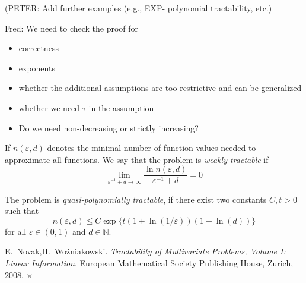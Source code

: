 \documentclass[11pt,a4paper]{article}
\newcommand{\fred}[1]{\begingroup\color{blue}Fred: #1\endgroup}
\newcommand{\peter}[1]{\begingroup\color{purple}#1\endgroup}
\begin{document}
\peter{(PETER: Add further examples (e.g., EXP- polynomial tractability, etc.)}

\bigskip

\fred{We need to check the proof for
\begin{itemize}
\item correctness
\item exponents
\item whether the additional assumptions are too restrictive and can be generalized
\item whether we need $\tau$ in the assumption
\item Do we need non-decreasing or strictly increasing?
\end{itemize}}
\begin{definition}
If $n(\varepsilon,d)$ denotes the minimal number of function values needed to approximate all functions. We say that the problem is \emph{weakly tractable} if
    \[\lim_{\varepsilon^{-1}+d\rightarrow \infty} \frac{\ln n(\varepsilon,d)}{\varepsilon^{-1}+d} = 0\]
\end{definition}
\begin{definition}
    The problem is \emph{quasi-polynomially tractable}, if there exist two constants $C, t> 0$ such that
    \[
    n(\varepsilon,d) \leq C\exp\{t(1+\ln(1/\varepsilon))(1+\ln(d))\}
    \] for all $\varepsilon \in (0,1)$ and $d\in\mathbb{N}$.
\end{definition}
\begin{thebibliography}{99}

 E.~Novak,H.~Wo\'zniakowski. \textit{Tractability of Multivariate Problems, Volume I: Linear Information}.
European Mathematical Society Publishing House, Zurich, 2008.
 ×
\end{thebibliography}
\end{document}
